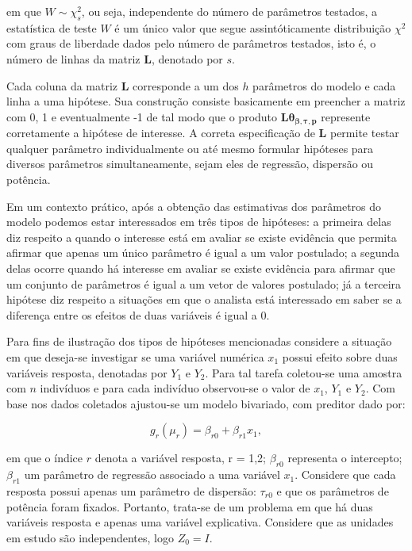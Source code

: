 \noindent em que $W \sim \chi^2_s$, ou seja, independente do número de parâmetros testados, a estatística de teste $W$ é um único valor que segue assintóticamente distribuição $\chi^2$ com graus de liberdade dados pelo número de parâmetros testados, isto é, o número de linhas da matriz $\boldsymbol{L}$, denotado por $s$. 

Cada coluna da matriz $\boldsymbol{L}$ corresponde a um dos $h$ parâmetros do modelo e cada linha a uma hipótese. Sua construção consiste basicamente em preencher a matriz com 0, 1 e eventualmente -1 de tal modo que o produto $\boldsymbol{L}\boldsymbol{\theta_{\beta,\tau,p}}$ represente corretamente a hipótese de interesse. A correta especificação de $\boldsymbol{L}$ permite testar qualquer parâmetro individualmente ou até mesmo formular hipóteses para diversos parâmetros simultaneamente, sejam eles de regressão, dispersão ou potência. 

Em um contexto prático, após a obtenção das estimativas dos parâmetros do modelo podemos estar interessados em três tipos de hipóteses: a primeira delas diz respeito a quando o interesse está em avaliar se existe evidência que permita afirmar que apenas um único parâmetro é igual a um valor postulado; a segunda delas ocorre quando há interesse em avaliar se existe evidência para afirmar que um conjunto de parâmetros é igual a um vetor de valores postulado; já a terceira hipótese diz respeito a situações em que o analista está interessado em saber se a diferença entre os efeitos de duas variáveis é igual a 0.

Para fins de ilustração dos tipos de hipóteses mencionadas considere a situação em que deseja-se investigar se uma variável numérica $x_1$ possui efeito sobre duas variáveis resposta, denotadas por $Y_1$ e $Y_2$. Para tal tarefa coletou-se uma amostra com $n$ indivíduos e para cada indivíduo observou-se o valor de $x_1$, $Y_1$ e $Y_2$. Com base nos dados coletados ajustou-se um modelo bivariado, com preditor dado por:

\begin{equation}
g_r(\mu_r) = \beta_{r0} + \beta_{r1} x_1,
\end{equation}

\noindent em que o índice $r$ denota a variável resposta, r = 1,2; $\beta_{r0}$ representa o intercepto; $\beta_{r1}$ um parâmetro de regressão associado a uma variável $x_1$. Considere que cada resposta possui apenas um parâmetro de dispersão: $\tau_{r0}$ e que os parâmetros de potência foram fixados. Portanto, trata-se de um problema em que há duas variáveis resposta e apenas uma variável explicativa. Considere que as unidades em estudo são independentes, logo $Z_0 = I$. 

